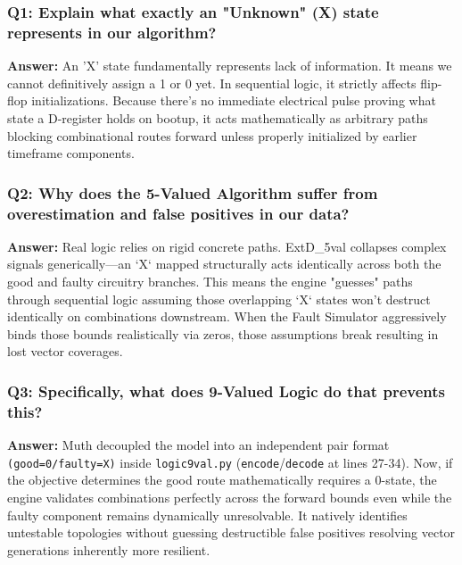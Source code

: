 \documentclass[12pt, a4paper]{article}
\begin{document}
\subsubsection*{Q1: Explain what exactly an "Unknown" (X) state represents in our algorithm?}
\textbf{Answer:} An 'X' state fundamentally represents lack of information. It means we cannot definitively assign a 1 or 0 yet. In sequential logic, it strictly affects flip-flop initializations. Because there's no immediate electrical pulse proving what state a D-register holds on bootup, it acts mathematically as arbitrary paths blocking combinational routes forward unless properly initialized by earlier timeframe components.

\subsubsection*{Q2: Why does the 5-Valued Algorithm suffer from overestimation and false positives in our data?}
\textbf{Answer:} Real logic relies on rigid concrete paths. ExtD_5val collapses complex signals generically—an `X` mapped structurally acts identically across both the good and faulty circuitry branches. This means the engine "guesses" paths through sequential logic assuming those overlapping `X` states won't destruct identically on combinations downstream. When the Fault Simulator aggressively binds those bounds realistically via zeros, those assumptions break resulting in lost vector coverages.

\subsubsection*{Q3: Specifically, what does 9-Valued Logic do that prevents this?}
\textbf{Answer:} Muth decoupled the model into an independent pair format \texttt{(good=0/faulty=X)} inside \texttt{logic9val.py} (\texttt{encode}/\texttt{decode} at lines 27-34). Now, if the objective determines the good route mathematically requires a 0-state, the engine validates combinations perfectly across the forward bounds even while the faulty component remains dynamically unresolvable. It natively identifies untestable topologies without guessing destructible false positives resolving vector generations inherently more resilient.
\end{document}
